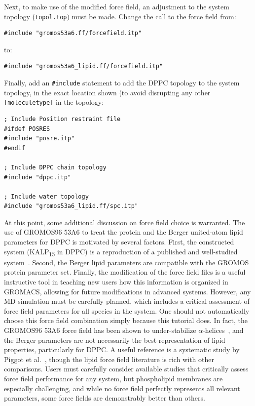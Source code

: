 \documentclass[9pt,tutorial,pubversion]{livecoms}
\begin{document}
Next, to make use of the modified force field, an adjustment to the system topology (\texttt{topol.top}) must be made. Change the call to the force field from:

\begin{lstlisting}[basicstyle=\small\ttfamily]
#include "gromos53a6.ff/forcefield.itp"
\end{lstlisting}
%
to:

\begin{lstlisting}[basicstyle=\small\ttfamily]
#include "gromos53a6_lipid.ff/forcefield.itp"
\end{lstlisting}

Finally, add an \texttt{\#include} statement to add the DPPC topology to the system topology, in the exact location shown (to avoid disrupting any other \texttt{[moleculetype]} in the topology:

\begin{lstlisting}[basicstyle=\small\ttfamily]
; Include Position restraint file
#ifdef POSRES
#include "posre.itp"
#endif

; Include DPPC chain topology
#include "dppc.itp"

; Include water topology
#include "gromos53a6_lipid.ff/spc.itp"
\end{lstlisting}

At this point, some additional discussion on force field choice is warranted. The use of GROMOS96 53A6 to treat the protein and the Berger united-atom lipid parameters for DPPC is motivated by several factors. First, the constructed system (KALP\textsubscript{15} in DPPC) is a reproduction of a published and well-studied system~\cite{Kandasamy2006}. Second, the Berger lipid parameters are compatible with the GROMOS protein parameter set. Finally, the modification of the force field files is a useful instructive tool in teaching new users how this information is organized in GROMACS, allowing for future modifications in advanced systems. However, any MD simulation must be carefully planned, which includes a critical assessment of force field parameters for all species in the system. One should not automatically choose this force field combination simply because this tutorial does. In fact, the GROMOS96 53A6 force field has been shown to under-stabilize $\alpha$-helices~\cite{Schmid2011}, and the Berger parameters are not necessarily the best representation of lipid properties, particularly for DPPC. A useful reference is a systematic study by Piggot et al.~\cite{Piggot2012}, though the lipid force field literature is rich with other comparisons. Users must carefully consider available studies that critically assess force field performance for any system, but phospholipid membranes are especially challenging, and while no force field perfectly represents all relevant parameters, some force fields are demonstrably better than others.
\end{document}

